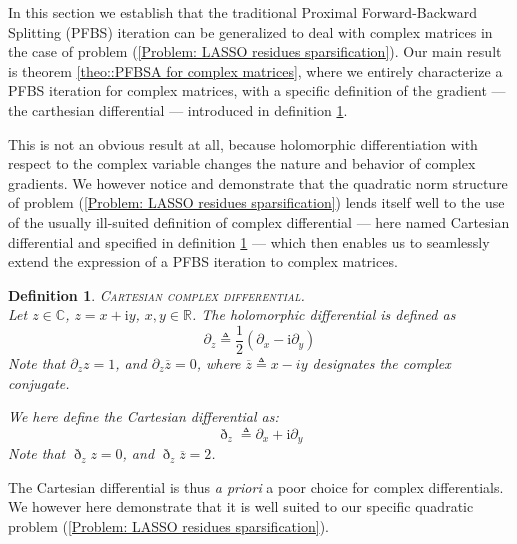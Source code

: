 \documentclass{article}
\newtheorem{definition}{Definition}
\begin{document}
In this section we establish that the traditional Proximal Forward-Backward Splitting (PFBS) iteration can be generalized to deal with complex matrices in the case of problem (\ref{Problem: LASSO residues sparsification}). Our main result is theorem \ref{theo::PFBSA for complex matrices}, where we entirely characterize a PFBS iteration for complex matrices, with a specific definition of the gradient --- the carthesian differential --- introduced in definition \ref{def::Cartesian differential}. 

This is not an obvious result at all, because holomorphic differentiation with respect to the complex variable changes the nature and behavior of complex gradients. 
We however notice and demonstrate that the quadratic norm structure of problem (\ref{Problem: LASSO residues sparsification}) lends itself well to the use of the usually ill-suited definition of complex differential --- here named Cartesian differential and specified in definition \ref{def::Cartesian differential} --- which then enables us to seamlessly extend the expression of a PFBS iteration to complex matrices.

\begin{definition}\label{def::Cartesian differential} \textsc{Cartesian complex differential}.\\
  Let $z \in \mathbb{C}$, $z = x + \mathrm{i} y$, $x , y \in \mathbb{R}$.
  The holomorphic differential is defined as
  \begin{equation}
      \partial_z \triangleq \frac{1}{2} \left(  \partial_x - \mathrm{i} \partial_y \right)
  \end{equation}
  Note that $\partial_z z = 1$, and $\partial_z \overline{z} = 0$, where $\overline{z} \triangleq x - i y$ designates the complex conjugate.
  
  We here define the Cartesian differential as: 
  \begin{equation}
      \eth_z \triangleq \partial_x + \mathrm{i} \partial_y
  \end{equation}
Note that $\eth_z z = 0$, and $\eth_z \overline{z} = 2$.
\end{definition}

The Cartesian differential is thus \textit{a priori} a poor choice for complex differentials. 
We however here demonstrate that it is well suited to our specific quadratic problem (\ref{Problem: LASSO residues sparsification}).
        
\end{document}
